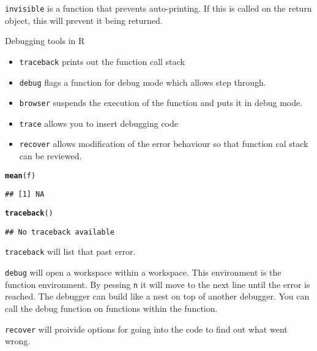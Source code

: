 \documentclass[12pt, a4paper, oneside]{article}\usepackage[]{graphicx}\usepackage[]{color}
\makeatletter
\newcommand{\hlstd}[1]{\textcolor[rgb]{0.345,0.345,0.345}{#1}}%
\newcommand{\hlkwd}[1]{\textcolor[rgb]{0.737,0.353,0.396}{\textbf{#1}}}%
\newenvironment{kframe}{%
 \def\at@end@of@kframe{}%
 \ifinner\ifhmode%
  \def\at@end@of@kframe{\end{minipage}}%
  \begin{minipage}{\columnwidth}%
 \fi\fi%
 \def\FrameCommand##1{\hskip\@totalleftmargin \hskip-\fboxsep
 \colorbox{shadecolor}{##1}\hskip-\fboxsep
     \hskip-\linewidth \hskip-\@totalleftmargin \hskip\columnwidth}%
 \MakeFramed {\advance\hsize-\width
   \@totalleftmargin\z@ \linewidth\hsize
   \@setminipage}}%
 {\par\unskip\endMakeFramed%
 \at@end@of@kframe}
\newenvironment{knitrout}{}{} %
\makeatother
\begin{document}
\lstinline{invisible} is a function that prevents auto-printing. If this is called on the return object, this will prevent it being returned. 

Debugging tools in R
\begin{itemize}
\item \lstinline{traceback} prints out the function call stack
\item \lstinline{debug} flags a function for debug mode which allows step through. 
\item \lstinline{browser} suspends the execution of the function and puts it in debug mode. 
\item \lstinline{trace} allows you to insert debugging code
\item \lstinline{recover} allows modification of the error behaviour so that function cal stack can be reviewed.
\end{itemize}

\begin{knitrout}
\color{fgcolor}\begin{kframe}
\begin{alltt}
\hlkwd{mean}\hlstd{(f)}
\end{alltt}


{\ttfamily\noindent\color{warningcolor}{\#\# Warning: argument is not numeric or logical: returning NA}}\begin{verbatim}
## [1] NA
\end{verbatim}
\begin{alltt}
\hlkwd{traceback}\hlstd{()}
\end{alltt}
\begin{verbatim}
## No traceback available
\end{verbatim}
\end{kframe}
\end{knitrout}

\lstinline{traceback} will list that past error.  

\lstinline{debug} will open a workspace within a workspace.  This environment is the function environment. By pessing \lstinline{n} it will move to the next line until the error is reached. The debugger can build like a nest on top of another debugger. You can call the debug function on functions within the function. 

\lstinline{recover} will proivide options for going into the code to find out what went wrong. 
\end{document}
